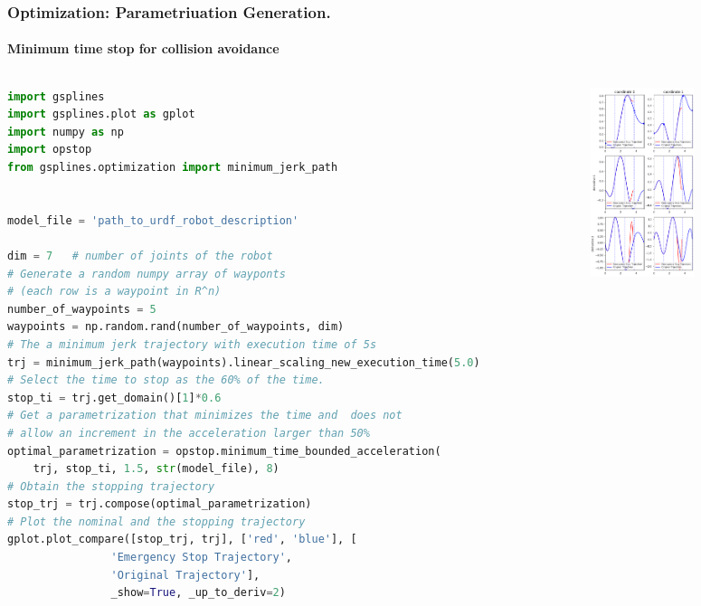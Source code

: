 \begin{frame}[fragile]
	\frametitle{Optimization: Parametriuation Generation.}
	\framesubtitle{Minimum time stop for collision avoidance}
	\begin{columns}
		\begin{column}{0.4\textwidth}
			\begin{lstlisting}[language=python,
            ]
import gsplines
import gsplines.plot as gplot
import numpy as np
import opstop
from gsplines.optimization import minimum_jerk_path


model_file = 'path_to_urdf_robot_description'

dim = 7   # number of joints of the robot
# Generate a random numpy array of wayponts
# (each row is a waypoint in R^n)
number_of_waypoints = 5
waypoints = np.random.rand(number_of_waypoints, dim)
# The a minimum jerk trajectory with execution time of 5s
trj = minimum_jerk_path(waypoints).linear_scaling_new_execution_time(5.0)
# Select the time to stop as the 60% of the time.
stop_ti = trj.get_domain()[1]*0.6
# Get a parametrization that minimizes the time and  does not
# allow an increment in the acceleration larger than 50%
optimal_parametrization = opstop.minimum_time_bounded_acceleration(
    trj, stop_ti, 1.5, str(model_file), 8)
# Obtain the stopping trajectory
stop_trj = trj.compose(optimal_parametrization)
# Plot the nominal and the stopping trajectory
gplot.plot_compare([stop_trj, trj], ['red', 'blue'], [
                'Emergency Stop Trajectory',
                'Original Trajectory'], 
                _show=True, _up_to_deriv=2)
    \end{lstlisting}
		\end{column}
		\begin{column}{0.6\textwidth}
			\includegraphics[width=3cm]{./images/temporal_opstopimage.png}
		\end{column}
	\end{columns}
\end{frame}
